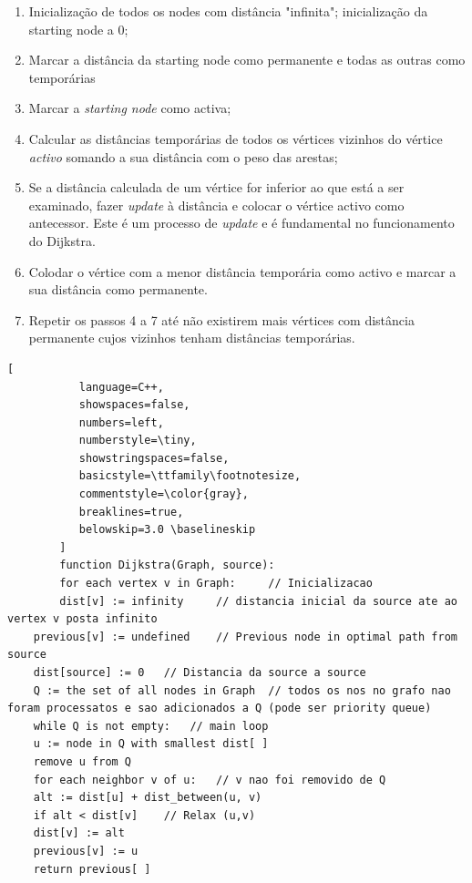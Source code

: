 \documentclass[a4paper]{article}
\begin{document}
\begin{enumerate}
    \item Inicialização de todos os nodes com distância "infinita"; inicialização da starting node a 0;
    \item Marcar a distância da starting node como permanente e todas as outras como temporárias
    \item Marcar a \textit{starting node} como activa;
    \item Calcular as distâncias temporárias de todos os vértices vizinhos do vértice \textit{activo} somando a sua distância com o peso das arestas;
    \item Se a distância calculada de um vértice for inferior ao que está a ser examinado, fazer \textit{update} à distância e colocar o vértice activo como antecessor. Este é um processo de \textit{update} e é fundamental no funcionamento do Dijkstra.
    \item Colodar o vértice com a menor distância temporária como activo e marcar a sua distância como permanente. 
    \item Repetir os passos 4 a 7 até não existirem mais vértices com distância permanente cujos vizinhos tenham distâncias temporárias. 
\end{enumerate}


\begin{lstlisting}[
           language=C++,
           showspaces=false,
           numbers=left,
           numberstyle=\tiny,
           showstringspaces=false,
           basicstyle=\ttfamily\footnotesize,
           commentstyle=\color{gray},
           breaklines=true,
           belowskip=3.0 \baselineskip
        ]
        function Dijkstra(Graph, source):
        for each vertex v in Graph: 	// Inicializacao
        dist[v] := infinity 	// distancia inicial da source ate ao vertex v posta infinito
 	previous[v] := undefined 	// Previous node in optimal path from source
 	dist[source] := 0 	// Distancia da source a source
 	Q := the set of all nodes in Graph 	// todos os nos no grafo nao foram processatos e sao adicionados a Q (pode ser priority queue)
 	while Q is not empty: 	// main loop
 	u := node in Q with smallest dist[ ]
 	remove u from Q
 	for each neighbor v of u: 	// v nao foi removido de Q 
 	alt := dist[u] + dist_between(u, v)
 	if alt < dist[v] 	// Relax (u,v)
 	dist[v] := alt
 	previous[v] := u
 	return previous[ ] 

\end{lstlisting}
\end{document}
